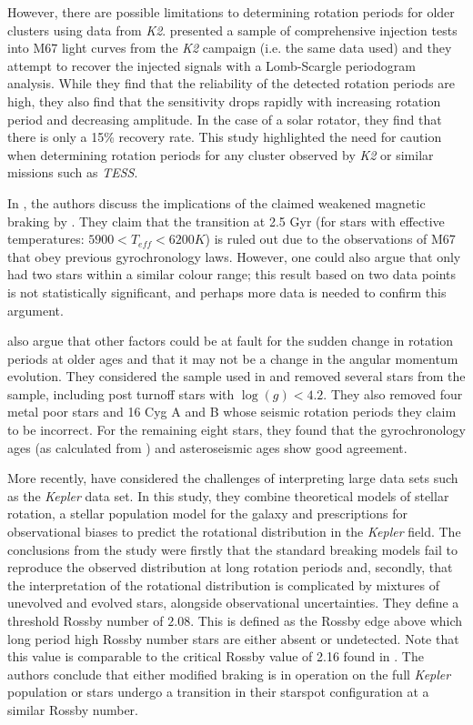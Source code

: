 However, there are possible limitations to determining rotation periods for older clusters using data from \textit{K2}. \citet{Esselstein_etal_2018} presented a sample of comprehensive injection tests into M67 light curves from the \textit{K2} campaign (i.e. the same data \citealt{Barnes_etal_2016} used) and they attempt to recover the injected signals with a Lomb-Scargle periodogram analysis. While they find that the reliability of the detected rotation periods are high, they also find that the sensitivity drops rapidly with increasing rotation period and decreasing amplitude. In the case of a solar rotator, they find that there is only a 15\% recovery rate. This study highlighted the need for caution when determining rotation periods for any cluster observed by \textit{K2} or similar missions such as \textit{TESS}.

In \citet{Barnes_etal_2016_aspect_gyro}, the authors discuss the implications of the claimed weakened magnetic braking by \citet{van_Saders_etal_2016}. They claim that the transition at 2.5 Gyr (for stars with effective temperatures: $5900 < T_{eff} < 6200 K$) is ruled out due to the observations of M67 \citep{Barnes_etal_2016} that obey previous gyrochronology laws. However, one could also argue that \citet{Barnes_etal_2016} only had two stars within a similar colour range; this result based on two data points is not statistically significant, and perhaps more data is needed to confirm this argument.

\citet{Barnes_etal_2016_aspect_gyro} also argue that other factors could be at fault for the sudden change in rotation periods at older ages and that it may not be a change in the angular momentum evolution. They considered the sample used in \citet{van_Saders_etal_2016} and removed several stars from the sample, including post turnoff stars with $\log(g) < 4.2$. They also removed four metal poor stars and 16 Cyg A and B whose seismic rotation periods they claim to be incorrect. For the remaining eight stars, they found that the gyrochronology ages (as calculated from \citealt{Barnes_2010}) and asteroseismic ages show good agreement.

More recently, \citet{van_Saders_etal_2019} have considered the challenges of interpreting large data sets such as the \textit{Kepler} data set. In this study, they combine theoretical models of stellar rotation, a stellar population model for the galaxy and prescriptions for observational biases to predict the rotational distribution in the \textit{Kepler} field. The conclusions from the study were firstly that the standard breaking models fail to reproduce the observed distribution at long rotation periods and, secondly, that the interpretation of the rotational distribution is complicated by mixtures of unevolved and evolved stars, alongside observational uncertainties. They define a threshold Rossby number of $2.08$. This is defined as the Rossby edge above which long period high Rossby number stars are either absent or undetected. Note that this value is comparable to the critical Rossby value of 2.16 found in \citet{van_Saders_etal_2016}. The authors conclude that either modified braking is in operation on the full \textit{Kepler} population or stars undergo a transition in their starspot configuration at a similar Rossby number.

